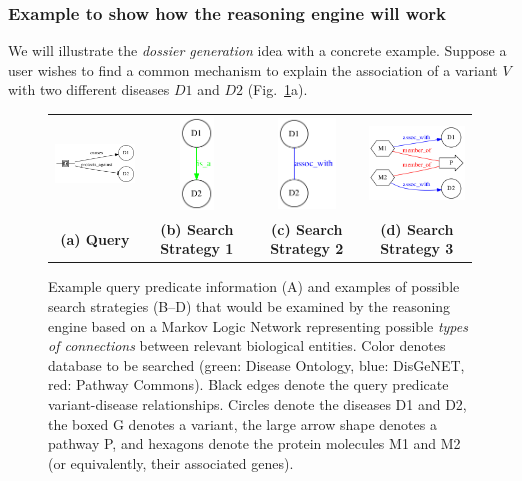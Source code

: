 \documentclass[11pt,notitlepage]{article}
\begin{document}
\subsubsection{Example to show how the reasoning engine will work}
We will illustrate the {\em dossier generation\/} idea with a concrete example. Suppose a user wishes to find a common mechanism to explain the association of a variant $V$ with two different diseases $D1$ and $D2$ (Fig.~\ref{fig:networks}a).
\begin{figure}[h!]
  \begin{tabular}{cccc}
    \includegraphics[width=1.4in]{baseproblem.png} &
    \includegraphics[width=0.35in]{net1.png} &
    \includegraphics[width=0.6in]{net2.png} &
    \includegraphics[width=1.5in]{net3.png}\\
    {\bf (a) Query} & {\bf (b) Search Strategy 1} & {\bf (c) Search Strategy 2} & {\bf (d) Search Strategy 3}
  \end{tabular}
  \caption{Example query predicate information (A) and examples of possible search strategies (B--D) that would be examined by the reasoning engine based on a Markov Logic Network representing possible {\em types of connections\/}  between relevant biological entities. Color denotes database to be searched (green: Disease Ontology, blue: DisGeNET, red: Pathway Commons). Black edges denote the query predicate variant-disease relationships. Circles denote the diseases D1 and D2, the boxed G denotes a variant, the large arrow shape denotes a pathway P, and hexagons denote the protein molecules M1 and M2 (or equivalently, their associated genes).}
  \label{fig:networks}
\end{figure}
\end{document}
